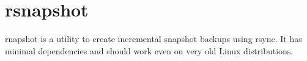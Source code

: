 \section{rsnapshot}

rnapshot is a utility to create incremental snapshot backups using rsync. It has minimal dependencies and should work even on very old Linux distributions.

